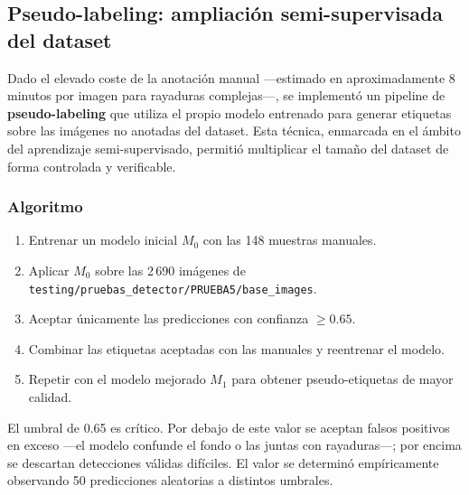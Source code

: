 \documentclass[12pt,a4paper]{article}
\begin{document}
\subsection{Pseudo-labeling: ampliación semi-supervisada del dataset}

Dado el elevado coste de la anotación manual —estimado en aproximadamente 8 minutos
por imagen para rayaduras complejas—, se implementó un pipeline de
\textbf{pseudo-labeling} que utiliza el propio modelo entrenado para generar etiquetas
sobre las imágenes no anotadas del dataset. Esta técnica, enmarcada en el ámbito del
aprendizaje semi-supervisado, permitió multiplicar el tamaño del dataset de forma
controlada y verificable.

\subsubsection{Algoritmo}

\begin{enumerate}
  \item Entrenar un modelo inicial $M_0$ con las 148 muestras manuales.
  \item Aplicar $M_0$ sobre las 2\,690 imágenes de \texttt{testing/pruebas\_detector/PRUEBA5/base\_images}.
  \item Aceptar únicamente las predicciones con confianza $\geq 0.65$.
  \item Combinar las etiquetas aceptadas con las manuales y reentrenar el modelo.
  \item Repetir con el modelo mejorado $M_1$ para obtener pseudo-etiquetas de mayor calidad.
\end{enumerate}

\begin{technote}
El umbral de 0.65 es crítico. Por debajo de este valor se aceptan falsos positivos en
exceso —el modelo confunde el fondo o las juntas con rayaduras—; por encima se descartan
detecciones válidas difíciles. El valor se determinó empíricamente observando 50
predicciones aleatorias a distintos umbrales.
\end{technote}
\end{document}
